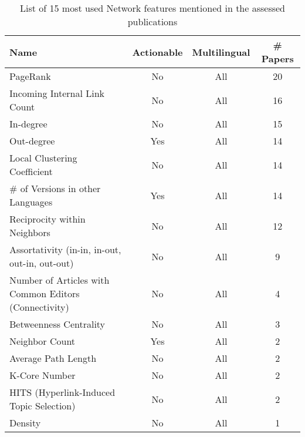 \begin{table}[htbp]
    \caption{List of 15 most used Network features mentioned in the assessed publications}
    \label{tab:feat_Network}
    \centering
    \begin{tabular}{m{} c c c}
        \toprule
        \textbf{Name} & \textbf{Actionable} & \textbf{Multilingual} & \textbf{\# Papers} \\ 
        \midrule
        PageRank & No & All & 20 \\
        Incoming Internal Link Count & No & All & 16 \\
        In-degree & No & All & 15 \\
        Out-degree & Yes & All & 14 \\
        Local Clustering Coefficient & No & All & 14 \\
        \# of Versions in other Languages & Yes & All & 14 \\
        Reciprocity within Neighbors & No & All & 12 \\
        Assortativity (in-in, in-out, out-in, out-out) & No & All & 9 \\
        Number of Articles with Common Editors (Connectivity) & No & All & 4 \\
        Betweenness Centrality & No & All & 3 \\
        Neighbor Count & Yes & All & 2 \\
        Average Path Length & No & All & 2 \\
        K-Core Number & No & All & 2 \\
        HITS (Hyperlink-Induced Topic Selection) & No & All & 2 \\
        Density & No & All & 1 \\
        \bottomrule
    \end{tabular}
\end{table}